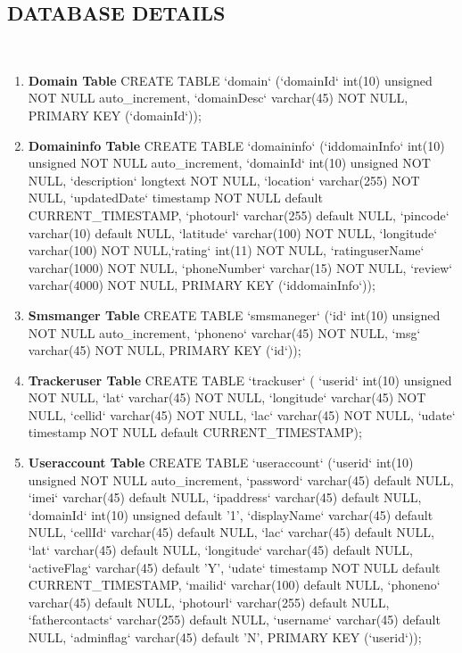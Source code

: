 \documentclass[12pt,a4paper]{article}
\begin{document}
\subsection{DATABASE DETAILS}
\\
\begin{enumerate}
\item \textbf{Domain Table}
\hspace{0.7 cm} CREATE TABLE `domain` (`domainId` int(10) unsigned NOT NULL auto_increment, `domainDesc` varchar(45) NOT NULL, PRIMARY KEY  (`domainId`));
\\
\item \textbf{Domaininfo Table}
\hspace{0.7 cm} CREATE TABLE `domaininfo` (`iddomainInfo` int(10) unsigned NOT NULL auto_increment, `domainId` int(10) unsigned NOT NULL, `description` longtext NOT NULL, `location` varchar(255) NOT NULL, `updatedDate` timestamp NOT NULL default CURRENT_TIMESTAMP, `photourl` varchar(255) default NULL, `pincode` varchar(10) default NULL, `latitude` varchar(100) NOT NULL, `longitude` varchar(100) NOT NULL,`rating` int(11) NOT NULL, `ratinguserName` varchar(1000) NOT NULL, `phoneNumber` varchar(15) NOT NULL, `review` varchar(4000) NOT NULL, PRIMARY KEY  (`iddomainInfo`));
\\
\item\textbf{Smsmanger Table}
\hspace{0.7 cm} CREATE TABLE `smsmaneger` (`id` int(10) unsigned NOT NULL auto_increment, `phoneno` varchar(45) NOT NULL, `msg` varchar(45) NOT NULL, PRIMARY KEY  (`id`));
\\
\item \textbf{Trackeruser Table}
\hspace{0.7 cm}CREATE TABLE `trackuser` ( `userid` int(10) unsigned NOT NULL, `lat` varchar(45) NOT NULL, `longitude` varchar(45) NOT NULL, `cellid` varchar(45) NOT NULL, `lac` varchar(45) NOT NULL, `udate` timestamp NOT NULL default CURRENT_TIMESTAMP);
\\
\item \textbf{Useraccount Table}
\hspace{0.7 cm}CREATE TABLE `useraccount` (`userid` int(10) unsigned NOT NULL auto_increment, `password` varchar(45) default NULL, `imei` varchar(45) default NULL, `ipaddress` varchar(45) default NULL, `domainId` int(10) unsigned default '1', `displayName` varchar(45) default NULL, `cellId` varchar(45) default NULL, `lac` varchar(45) default NULL, `lat` varchar(45) default NULL, `longitude` varchar(45) default NULL, `activeFlag` varchar(45) default 'Y', `udate` timestamp NOT NULL default CURRENT_TIMESTAMP, `mailid` varchar(100) default NULL, `phoneno` varchar(45) default NULL, `photourl` varchar(255) default NULL, `fathercontacts` varchar(255) default NULL, `username` varchar(45) default NULL, `adminflag` varchar(45) default 'N', PRIMARY KEY  (`userid`));

\end{enumerate}
\end{document}
